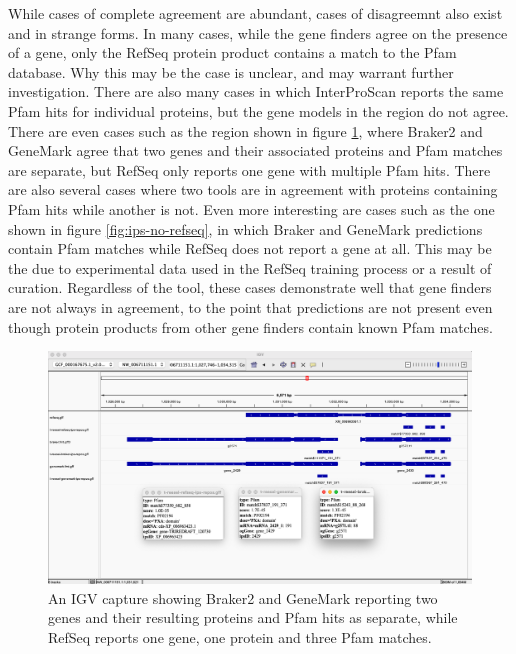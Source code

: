 While cases of complete agreement are abundant, cases of disagreemnt
also exist and in strange forms. In many cases, while the gene finders
agree on the presence of a gene, only the RefSeq protein product
contains a match to the Pfam database. Why this may be the case is
unclear, and may warrant further investigation. There are also many
cases in which InterProScan reports the same Pfam hits for individual
proteins, but the gene models in the region do not agree. There are
even cases such as the region shown in figure
\ref{fig:agree-bizarre2}, where Braker2 and GeneMark agree that two
genes and their associated proteins and Pfam matches are separate, but
RefSeq only reports one gene with multiple Pfam hits. There are also
several cases where two tools are in agreement with proteins
containing Pfam hits while another is not. Even more interesting are
cases such as the one shown in figure \ref{fig:ips-no-refseq}, in
which Braker and GeneMark predictions contain Pfam matches while
RefSeq does not report a gene at all. This may be the due to
experimental data used in the RefSeq training process or a result of
curation. Regardless of the tool, these cases demonstrate well that
gene finders are not always in agreement, to the point that
predictions are not present even though protein products from other
gene finders contain known Pfam matches.

\begin{figure}[h!]
  \centering
  \includegraphics[width=\textwidth]{figures/igv/ips-model-disagree2.png}
  \caption[Split Pfam matches]{An IGV capture showing Braker2 and
    GeneMark reporting two genes and their resulting proteins and
    Pfam hits as separate, while RefSeq reports one gene, one protein
    and three Pfam matches.}
  \label{fig:agree-bizarre2}
\end{figure}

